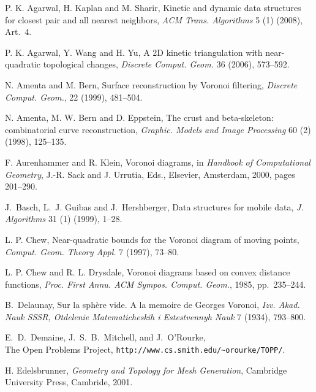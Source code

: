 \documentclass[letter,11pt]{article}
\begin{document}
\begin{thebibliography}{10}










P. K. Agarwal, H. Kaplan and M. Sharir, Kinetic and dynamic data
structures for closest pair and all nearest neighbors, \emph{ACM
Trans. Algorithms} 5 (1) (2008), Art.~4.

P. K. Agarwal, Y. Wang and H. Yu,
A 2D kinetic triangulation with near-quadratic topological changes,
\textit{Discrete Comput. Geom.} 36 (2006), 573--592.



N. Amenta and M. Bern, 
Surface reconstruction by Voronoi filtering,
{\em Discrete Comput. Geom.}, 22 (1999), 481--504.

N. Amenta, M. W. Bern and D. Eppstein, The crust and beta-skeleton: combinatorial curve reconstruction, 
{\it Graphic. Models and Image Processing} 60 (2) (1998), 125--135. 





F. Aurenhammer and R. Klein,
Voronoi diagrams,
in {\it Handbook of Computational Geometry},
J.-R. Sack and J. Urrutia, Eds.,
Elsevier, Amsterdam, 2000,
pages 201--290.

J.~Basch, L.~J. Guibas and J.~Hershberger,
Data structures for mobile data,
{\em J. Algorithms} 31 (1) (1999), 1--28.

L. P. Chew,
Near-quadratic bounds for the  Voronoi diagram of moving points,
{\em Comput. Geom. Theory Appl.}  7 (1997), 73--80.

L. P. Chew and R. L. Drysdale,
Voronoi diagrams based on convex distance functions,
{\em Proc. First Annu. ACM Sympos. Comput. Geom.}, 1985, pp.~235--244.



B.~Delaunay,
Sur la sph{\`e}re vide. {A} la memoire de {Georges} {Voronoi},
{\em Izv. Akad. Nauk SSSR, Otdelenie Matematicheskih i Estestvennyh
Nauk} 7 (1934), 793--800.

E.~D.~Demaine, J.~S.~B.~Mitchell, and J.~O'Rourke,\\
The Open Problems Project,
\texttt{http://www.cs.smith.edu/\~{ }orourke/TOPP/}.

H. Edelsbrunner,
{\em Geometry and Topology for Mesh Generation},
Cambridge University Press, Cambride, 2001.


\end{thebibliography}
\end{document}
